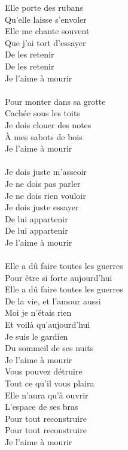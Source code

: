 Elle porte des rubans\\
Qu'elle laisse s'envoler\\
Elle me chante souvent\\
Que j'ai tort d'essayer\\
De les retenir\\
De les retenir\\
Je l'aime à mourir\\\\
Pour monter dans sa grotte\\
Cachée sous les toits\\
Je dois clouer des notes\\
À mes sabots de bois\\
Je l'aime à mourir\\\\
Je dois juste m'asseoir\\
Je ne dois pas parler\\
Je ne dois rien vouloir\\
Je dois juste essayer\\
De lui appartenir\\
De lui appartenir\\
Je l'aime à mourir\\\\
Elle a dû faire toutes les guerres\\
Pour être si forte aujourd'hui\\
Elle a dû faire toutes les guerres\\
De la vie, et l'amour aussi\\
Moi je n'étais rien\\
Et voilà qu'aujourd'hui\\
Je suis le gardien\\
Du sommeil de ses nuits\\
Je l'aime à mourir\\
Vous pouvez détruire\\
Tout ce qu'il vous plaira\\
Elle n'aura qu'à ouvrir\\
L'espace de ses bras\\
Pour tout reconstruire\\
Pour tout reconstruire\\
Je l'aime à mourir
